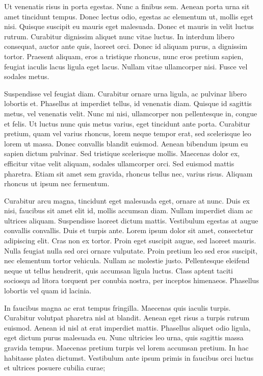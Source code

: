 \documentclass{book}
\begin{document}
            Ut venenatis risus in porta egestas. Nunc a finibus sem. Aenean porta urna sit amet
               tincidunt tempus. Donec lectus odio, egestas ac elementum ut, mollis eget nisi.
               Quisque suscipit eu mauris eget malesuada. Donec et mauris in velit luctus rutrum.
               Curabitur dignissim aliquet nunc vitae luctus. In interdum libero consequat, auctor
               ante quis, laoreet orci. Donec id aliquam purus, a dignissim tortor. Praesent
               aliquam, eros a tristique rhoncus, nunc eros pretium sapien, feugiat iaculis lacus
               ligula eget lacus. Nullam vitae ullamcorper nisi. Fusce vel sodales metus.

            Suspendisse vel feugiat diam. Curabitur ornare urna ligula, ac pulvinar libero
               lobortis et. Phasellus at imperdiet tellus, id venenatis diam. Quisque id sagittis
               metus, vel venenatis velit. Nunc mi nisi, ullamcorper non pellentesque in, congue et
               felis. Ut luctus nunc quis metus varius, eget tincidunt ante porta. Curabitur
               pretium, quam vel varius rhoncus, lorem neque tempor erat, sed scelerisque leo lorem
               ut massa. Donec convallis blandit euismod. Aenean bibendum ipsum eu sapien dictum
               pulvinar. Sed tristique scelerisque mollis. Maecenas dolor ex, efficitur vitae velit
               aliquam, sodales ullamcorper orci. Sed euismod mattis pharetra. Etiam sit amet sem
               gravida, rhoncus tellus nec, varius risus. Aliquam rhoncus ut ipsum nec
               fermentum.

            Curabitur arcu magna, tincidunt eget malesuada eget, ornare at nunc. Duis ex nisi,
               faucibus sit amet elit id, mollis accumsan diam. Nullam imperdiet diam ac ultrices
               aliquam. Suspendisse laoreet dictum mattis. Vestibulum egestas at augue convallis
               convallis. Duis et turpis ante. Lorem ipsum dolor sit amet, consectetur adipiscing
               elit. Cras non ex tortor. Proin eget suscipit augue, sed laoreet mauris. Nulla
               feugiat nulla sed orci ornare vulputate. Proin pretium leo sed eros suscipit, nec
               elementum tortor vehicula. Nullam ac molestie justo. Pellentesque eleifend neque ut
               tellus hendrerit, quis accumsan ligula luctus. Class aptent taciti sociosqu ad litora
               torquent per conubia nostra, per inceptos himenaeos. Phasellus lobortis vel quam id
               lacinia.

            In faucibus magna ac erat tempus fringilla. Maecenas quis iaculis turpis. Curabitur
               volutpat pharetra nisl at blandit. Aenean eget risus a turpis rutrum euismod. Aenean
               id nisl at erat imperdiet mattis. Phasellus aliquet odio ligula, eget dictum purus
               malesuada eu. Nunc ultricies leo urna, quis sagittis massa gravida tempus. Maecenas
               pretium turpis vel lorem accumsan pretium. In hac habitasse platea dictumst.
               Vestibulum ante ipsum primis in faucibus orci luctus et ultrices posuere cubilia
               curae;
\end{document}
